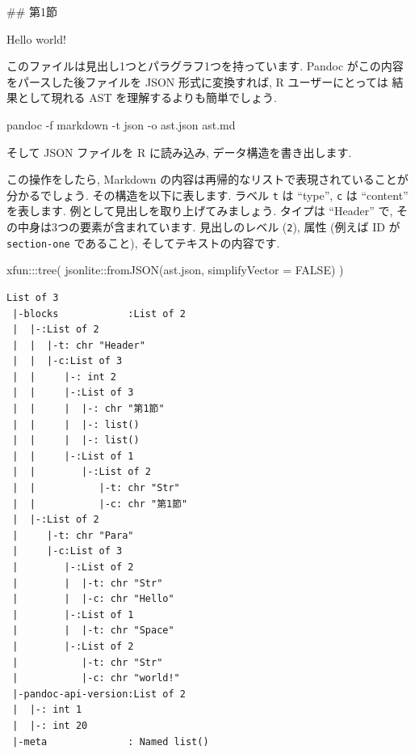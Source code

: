 \documentclass[
  11pt,
]{bxjsreport}
\newenvironment{Shaded}{\begin{snugshade}}{\end{snugshade}}
\newcommand{\AttributeTok}[1]{\textcolor[rgb]{0.77,0.63,0.00}{#1}}
\newcommand{\ConstantTok}[1]{\textcolor[rgb]{0.00,0.00,0.00}{#1}}
\newcommand{\ExtensionTok}[1]{#1}
\newcommand{\FunctionTok}[1]{\textcolor[rgb]{0.00,0.00,0.00}{#1}}
\newcommand{\NormalTok}[1]{#1}
\newcommand{\SpecialCharTok}[1]{\textcolor[rgb]{0.00,0.00,0.00}{#1}}
\newcommand{\StringTok}[1]{\textcolor[rgb]{0.31,0.60,0.02}{#1}}
\begin{document}
\begin{Shaded}
\begin{Highlighting}[numbers=left,,]
\FunctionTok{\#\# 第1節}

\NormalTok{Hello world!}
\end{Highlighting}
\end{Shaded}

このファイルは見出し1つとパラグラフ1つを持っています. Pandoc がこの内容をパースした後ファイルを JSON 形式に変換すれば, R ユーザーにとっては 結果として現れる AST を理解するよりも簡単でしょう.

\begin{Shaded}
\begin{Highlighting}[numbers=left,,]
\ExtensionTok{pandoc}\NormalTok{ {-}f markdown {-}t json {-}o ast.json ast.md}
\end{Highlighting}
\end{Shaded}

そして JSON ファイルを R に読み込み, データ構造を書き出します.

この操作をしたら, Markdown の内容は再帰的なリストで表現されていることが分かるでしょう. その構造を以下に表します. ラベル \texttt{t} は ``type'', \texttt{c} は ``content'' を表します. 例として見出しを取り上げてみましょう. タイプは ``Header'' で, その中身は3つの要素が含まれています. 見出しのレベル (\texttt{2}), 属性 (例えば ID が \texttt{section-one} であること), そしてテキストの内容です.

\begin{Shaded}
\begin{Highlighting}[numbers=left,,]
\NormalTok{xfun}\SpecialCharTok{:::}\FunctionTok{tree}\NormalTok{(}
\NormalTok{  jsonlite}\SpecialCharTok{::}\FunctionTok{fromJSON}\NormalTok{(}\StringTok{\textquotesingle{}ast.json\textquotesingle{}}\NormalTok{, }\AttributeTok{simplifyVector =} \ConstantTok{FALSE}\NormalTok{)}
\NormalTok{)}
\end{Highlighting}
\end{Shaded}

\begin{verbatim}
List of 3
 |-blocks            :List of 2
 |  |-:List of 2
 |  |  |-t: chr "Header"
 |  |  |-c:List of 3
 |  |     |-: int 2
 |  |     |-:List of 3
 |  |     |  |-: chr "第1節"
 |  |     |  |-: list()
 |  |     |  |-: list()
 |  |     |-:List of 1
 |  |        |-:List of 2
 |  |           |-t: chr "Str"
 |  |           |-c: chr "第1節"
 |  |-:List of 2
 |     |-t: chr "Para"
 |     |-c:List of 3
 |        |-:List of 2
 |        |  |-t: chr "Str"
 |        |  |-c: chr "Hello"
 |        |-:List of 1
 |        |  |-t: chr "Space"
 |        |-:List of 2
 |           |-t: chr "Str"
 |           |-c: chr "world!"
 |-pandoc-api-version:List of 2
 |  |-: int 1
 |  |-: int 20
 |-meta              : Named list()
\end{verbatim}
\end{document}
